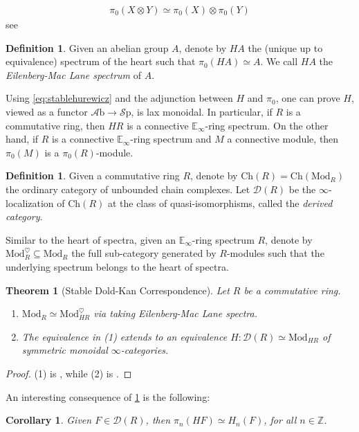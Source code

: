 \documentclass[10pt]{amsart}
\newcommand{\D}{\mathscr{D}}
\newcommand{\bE}{\mathbb{E}}
\newcommand{\bZ}{\mathbb{Z}}
\newcommand{\Sp}{\mathscr{S}\mathrm{p}}
\newcommand{\Ch}{\mathrm{Ch}}
\newcommand{\Mod}{\mathrm{Mod}}
\newcommand{\Ab}{\mathscr{A}\mathrm{b}}
\newtheorem{theorem}[equation]{Theorem}
\newtheorem{corollary}[equation]{Corollary}
\theoremstyle{definition}
\newtheorem{definition}[equation]{Definition}
\theoremstyle{remark}
\numberwithin{equation}{section}
\begin{document}
\begin{align}\label{eq:stablehurewicz}
  \pi_0(X\otimes Y)\simeq\pi_0(X)\otimes\pi_0(Y)
\end{align}
see \cite[Theorem 2.3.28]{davies2024atii}

\begin{definition}Given an abelian group $A$, denote by $HA$ the (unique up to equivalence) spectrum of the heart such that $\pi_0(HA)\simeq A$. We call $HA$ the \emph{Eilenberg-Mac Lane spectrum} of $A$.
\end{definition}
Using \cref{eq:stablehurewicz} and the adjunction between $H$ and $\pi_0$, one can prove $H$, viewed as a functor $\Ab\to\Sp$, is lax monoidal. In particular, if $R$ is a commutative ring, then $HR$ is a connective $\bE_\infty$-ring spectrum. On the other hand, if $R$ is a connective $\bE_\infty$-ring spectrum and $M$ a connective module, then $\pi_0(M)$ is a $\pi_0(R)$-module. 
\begin{definition}
  Given a commutative ring $R$, denote by $\Ch(R)=\Ch(\Mod_{R})$ the ordinary category of unbounded chain complexes. Let $\D(R)$ be the $\infty$-localization of $\Ch(R)$ at the class of quasi-isomorphisms, called the \emph{derived category}.  
\end{definition} 
Similar to the heart of spectra, given an $\bE_\infty$-ring spectrum $R$, denote by $\Mod_{R}^\heartsuit\subseteq \Mod_{R}$ the full sub-category generated by $R$-modules such that the underlying spectrum belongs to the heart of spectra. 
\begin{theorem}[Stable Dold-Kan Correspondence]\label{thm:stabledk}
  Let $R$ be a commutative ring. 
  \begin{enumerate}
    \item $\Mod_{R}\simeq \Mod_{HR}^\heartsuit$ via taking Eilenberg-Mac Lane spectra.
    \item The equivalence in (1) extends to an equivalence $H:\D(R)\simeq \Mod_{HR}$ of symmetric monoidal $\infty$-categories.
  \end{enumerate} 
\end{theorem}
\begin{proof}
  (1) is \cite[Proposition 7.1.1.13]{lurie2017ha}, while (2) is \cite[Theorem 7.1.2.13]{lurie2017ha}.
\end{proof}
An interesting consequence of \cref{thm:stabledk} is the following:
\begin{corollary}\label{cor:homotopyvshomology}
  Given $F\in\D(R)$, then $\pi_n(HF)\simeq H_n(F)$, for all $n\in\bZ$.
\end{corollary}
\end{document}
